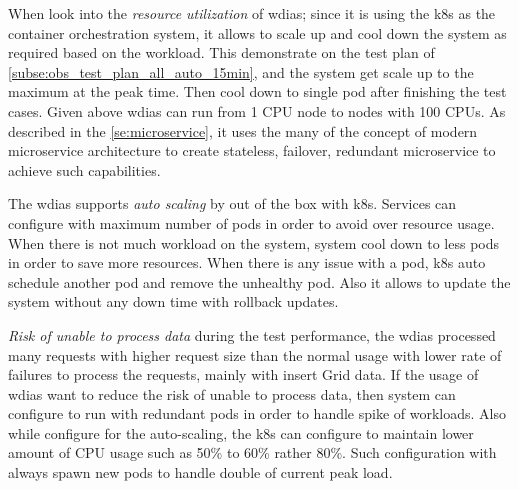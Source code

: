When look into the \emph{resource utilization} of \acrshort{wdias}; since it is using the \acrshort{k8s} as the container orchestration system, it allows to scale up and cool down the system as required based on the workload. This demonstrate on the test plan of \cref{subse:obs_test_plan_all_auto_15min}, and the system get scale up to the maximum at the peak time. Then cool down to single pod after finishing the test cases.
Given above \acrshort{wdias} can run from 1 CPU node to nodes with 100 CPUs. As described in the \cref{se:microservice}, it uses the many of the concept of modern microservice architecture to create stateless, failover, redundant microservice to achieve such capabilities.

The \acrshort{wdias} supports \emph{auto scaling} by out of the box with \acrshort{k8s}. Services can configure with maximum number of pods in order to avoid over resource usage. When there is not much workload on the system, system cool down to less pods in order to save more resources. When there is any issue with a pod, \acrshort{k8s} auto schedule another pod and remove the unhealthy pod. Also it allows to update the system without any down time with rollback updates.

\emph{Risk of unable to process data} during the test performance, the \acrshort{wdias} processed many requests with higher request size than the normal usage with lower rate of failures to process the requests, mainly with insert Grid data. If the usage of \acrshort{wdias} want to reduce the risk of unable to process data, then system can configure to run with redundant pods in order to handle spike of workloads. Also while configure for the auto-scaling, the \acrshort{k8s} can configure to maintain lower amount of CPU usage such as 50\% to 60\% rather 80\%. Such configuration with always spawn new pods to handle double of current peak load.
